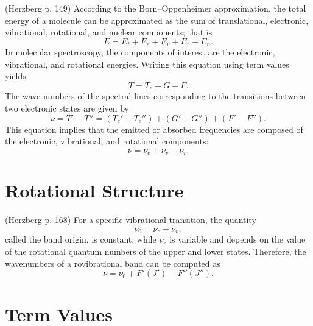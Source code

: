 \documentclass[11pt, twoside, fleqn]{report}
\begin{document}
 (Herzberg p. 149)
According to the Born--Oppenheimer approximation, the total energy of a molecule can be approximated as the sum of translational, electronic, vibrational, rotational, and nuclear components; that is
\begin{equation*}
    E = E_{t} + E_{e} + E_{v} + E_{r} + E_{n}.
\end{equation*}
In molecular spectroscopy, the components of interest are the electronic, vibrational, and rotational energies. Writing this equation using term values yields
\begin{equation*}
    T = T_{e} + G + F.
\end{equation*}
The wave numbers of the spectral lines corresponding to the transitions between two electronic states are given by
\begin{equation*}
    \nu = T' - T'' = (T_{e}' - T_{e}'') + (G' - G'') + (F' - F'').
\end{equation*}
This equation implies that the emitted or absorbed frequencies are composed of the electronic, vibrational, and rotational components:
\begin{equation*}
    \nu = \nu_{e} + \nu_{v} + \nu_{r}.
\end{equation*}

\section{Rotational Structure}

 (Herzberg p. 168)
For a specific vibrational transition, the quantity
\begin{equation*}
    \nu_{0} = \nu_{e} + \nu_{v},
\end{equation*}
called the band origin, is constant, while $\nu_{r}$ is variable and depends on the value of the rotational quantum numbers of the upper and lower states. Therefore, the wavenumbers of a rovibrational band can be computed as
\begin{equation*}
    \nu = \nu_{0} + F'(J') - F''(J'').
\end{equation*}

\section{Term Values}
\end{document}
